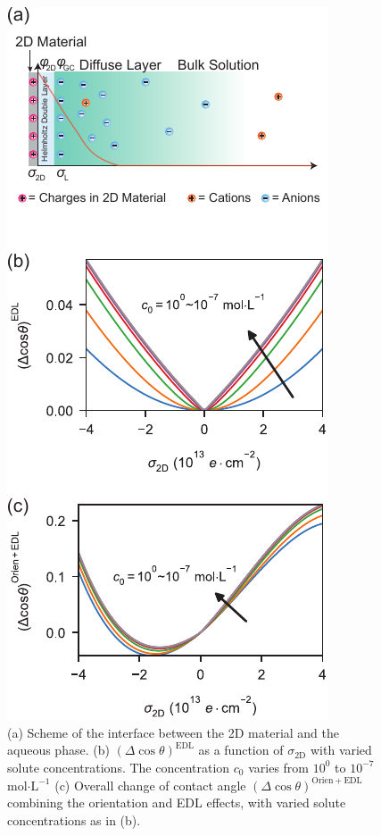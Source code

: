 \documentclass[journal=jacsat,manuscript=article,email=true]{achemso}
\begin{document}
\begin{figure}[htbp]
\centering
\includegraphics[width=0.5\linewidth]{../img/2d-ph-dependency+MD.pdf}
\caption{\label{fig:res-EDL}
(a) Scheme of the interface between the 2D material and the aqueous phase. (b) \((\Delta\cos\theta)^{\mathrm{EDL}}\) as a function of \(\sigma_{\mathrm{2D}}\) with varied solute concentrations. The concentration \(c_{0}\) varies from \(10^{0}\) to \(10^{-7}\) mol\(\cdot\mathrm{L}^{-1}\) (c) Overall change of contact angle \((\Delta \cos \theta)^{\mathrm{Orien+EDL}}\) combining the orientation and EDL effects, with varied solute concentrations as in (b).}
\end{figure}
\end{document}
